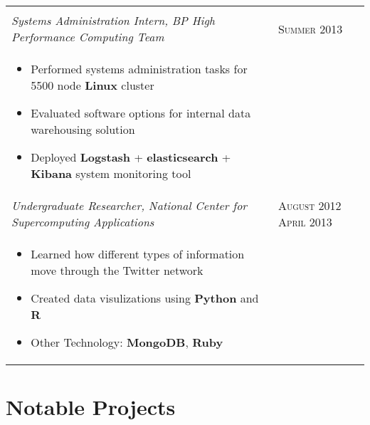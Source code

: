 \documentclass[letterpaper,10pt]{article}
\begin{document}
\begin{tabular}{p{12.8cm}>{\raggedleft\arraybackslash}p{3cm}}
\begin{itemize}
    \end{itemize} \\

    \emph{Systems Administration Intern, BP High Performance Computing Team} &
    \textsc{Summer 2013} \\

    \vspace{-2mm}
    \begin{itemize}
        \item
            Performed systems administration tasks for 5500 node \textbf{Linux} cluster
        \item
            Evaluated software options for internal data warehousing solution
        \item
            Deployed \textbf{Logstash} + \textbf{elasticsearch} +
            \textbf{Kibana} system monitoring tool
    \end{itemize} \\

    \emph{Undergraduate Researcher, National Center for Supercomputing Applications} &
    \textsc{August 2012 April 2013} \\

    \vspace{-6mm}
    \begin{itemize}
        \item
            Learned how different types of information move through the Twitter
            network
        \item
            Created data visulizations using \textbf{Python} and \textbf{R}
        \item
            Other Technology: \textbf{MongoDB}, \textbf{Ruby}
    \end{itemize}
\end{tabular}

\section{Notable Projects}
\end{document}
